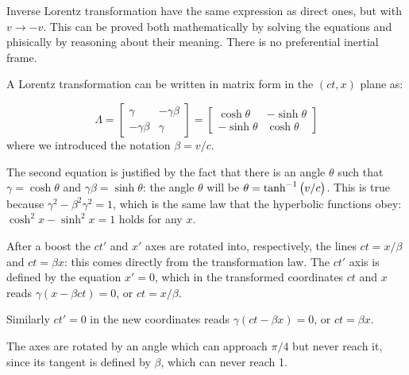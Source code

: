 \documentclass[main.tex]{subfiles}
\begin{document}
Inverse Lorentz transformation have the same expression as direct ones, but with \(v \rightarrow -v\).
This can be proved both mathematically by solving the equations and phisically by reasoning about their meaning. There is no preferential inertial frame.

A Lorentz transformation can be written in matrix form in the \((ct, x)\) plane as:

\begin{equation}
  \Lambda = \begin{bmatrix}
    \gamma & -\gamma \beta \\
    -\gamma \beta & \gamma
  \end{bmatrix}
  = \begin{bmatrix}
  \cosh \theta & -\sinh \theta \\
    -\sinh \theta &  \cosh \theta
  \end{bmatrix}
\end{equation}
%
where we introduced the notation \(\beta = v / c\).

The second equation is justified by the fact that there is an angle \(\theta\) such that \(\gamma = \cosh \theta\) and \(\gamma \beta = \sinh \theta\): the angle \(\theta\) will be \(\theta = \tanh^{-1} \qty(v/c)\). 
This is true because \(\gamma^2 - \beta^2 \gamma^2 = 1\), which is the same law that the hyperbolic functions obey: \(\cosh^2 x - \sinh^2 x =1 \) holds for any \(x\).

After a boost the \(ct'\) and \(x'\) axes are rotated into, respectively, the lines \(ct=x/\beta\) and \(ct = \beta x\): this comes directly from the transformation law. 
The \(ct'\) axis is defined by the equation \(x' =0\), which in the transformed coordinates \(ct\) and \(x\) reads \(\gamma (x - \beta ct) = 0\), or \(ct  = x/ \beta \).

Similarly \(ct' = 0\) in the new coordinates reads \(\gamma (ct - \beta x)=0\), or  \(ct = \beta x\). 

The axes are rotated by an angle which can approach \(\pi /4\) but never reach it, since its tangent is defined by \(\beta \), which can never reach 1. 
\end{document}

